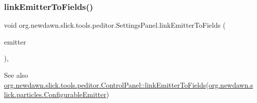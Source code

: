 \subsubsection{\texorpdfstring{link\+Emitter\+To\+Fields()}{linkEmitterToFields()}}
{\footnotesize\ttfamily void org.\+newdawn.\+slick.\+tools.\+peditor.\+Settings\+Panel.\+link\+Emitter\+To\+Fields (\begin{DoxyParamCaption}\item[{\mbox{\hyperlink{classorg_1_1newdawn_1_1slick_1_1particles_1_1_configurable_emitter}{Configurable\+Emitter}}}]{emitter }\end{DoxyParamCaption})\hspace{0.3cm}{\ttfamily [inline]}, {\ttfamily [protected]}}

\begin{DoxySeeAlso}{See also}
\mbox{\hyperlink{classorg_1_1newdawn_1_1slick_1_1tools_1_1peditor_1_1_control_panel_a55fa468548caadc265ea28c5f3214a20}{org.\+newdawn.\+slick.\+tools.\+peditor.\+Control\+Panel\+::link\+Emitter\+To\+Fields}}(\mbox{\hyperlink{classorg_1_1newdawn_1_1slick_1_1particles_1_1_configurable_emitter}{org.\+newdawn.\+slick.\+particles.\+Configurable\+Emitter}}) 
\end{DoxySeeAlso}


